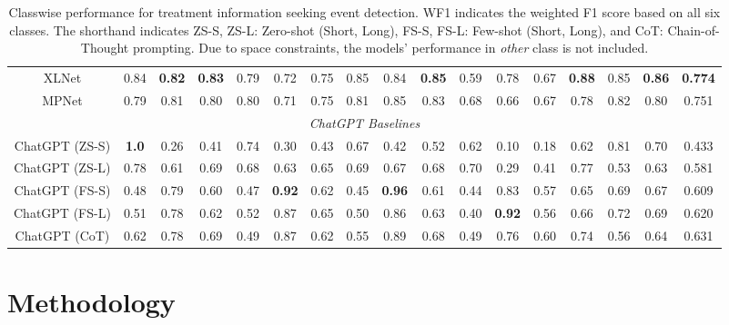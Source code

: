 \documentclass[letterpaper]{article} %
\begin{document}
\begin{table}[h!]
\begin{tabular}{cccc|ccc|ccc|ccc|ccc|c}
XLNet & 0.84 & \textbf{0.82} & \textbf{0.83} & 0.79 & 0.72 & 0.75 & 0.85 & 0.84 & \textbf{0.85} & 0.59 & 0.78 & 0.67 &\textbf{0.88} & 0.85 & \textbf{0.86} & \textbf{0.774}   \\
MPNet & 0.79 & 0.81 & 0.80 & 0.80 & 0.71 & 0.75 & 0.81 & 0.85 & 0.83 & 0.68 & 0.66 & 0.67 & 0.78 & 0.82 & 0.80 & 0.751\\
\hline
\multicolumn{17}{c}{\textit{ChatGPT Baselines}}\\
\hline
ChatGPT (ZS-S) & \textbf{1.0} & 0.26  & 0.41  &  0.74 & 0.30& 0.43  &  0.67& 0.42 & 0.52  &  0.62 & 0.10 & 0.18  & 0.62 & 0.81 &  0.70  & 0.433\\
ChatGPT (ZS-L) & 0.78 &  0.61 &  0.69  &  0.68 & 0.63 & 0.65  &  0.69 & 0.67 & 0.68  &  0.70 & 0.29 & 0.41  & 0.77 & 0.53 & 0.63  & 0.581 \\
ChatGPT (FS-S) &  0.48 & 0.79 & 0.60  & 0.47 & \textbf{0.92} & 0.62  &  0.45 & \textbf{0.96} & 0.61  &  0.44 & 0.83& 0.57  & 0.65 & 0.69 &     0.67  & 0.609 \\
ChatGPT (FS-L) &  0.51  & 0.78 & 0.62  & 0.52  & 0.87 &   0.65 &  0.50 & 0.86  &  0.63  & 0.40  &   \textbf{0.92}   &   0.56  &0.66    &  0.72  &    0.69  & 0.620 \\

ChatGPT (CoT) & 0.62 & 0.78 & 0.69 & 0.49 & 0.87 & 0.62 &  0.55 &  0.89 & 0.68  &  0.49 & 0.76 & 0.60 & 0.74 & 0.56 & 0.64 & 0.631 \\
\hline            
\end{tabular}
\caption{Classwise performance for treatment information seeking event detection. WF1 indicates the weighted F1 score based on all six classes. The shorthand indicates ZS-S, ZS-L: Zero-shot (Short, Long), FS-S, FS-L: Few-shot (Short, Long), and CoT: Chain-of-Thought prompting. Due to space constraints, the models' performance in \textit{other} class is not included. }
\label{all-results}
\end{table}
\section{Methodology}
\end{document}
